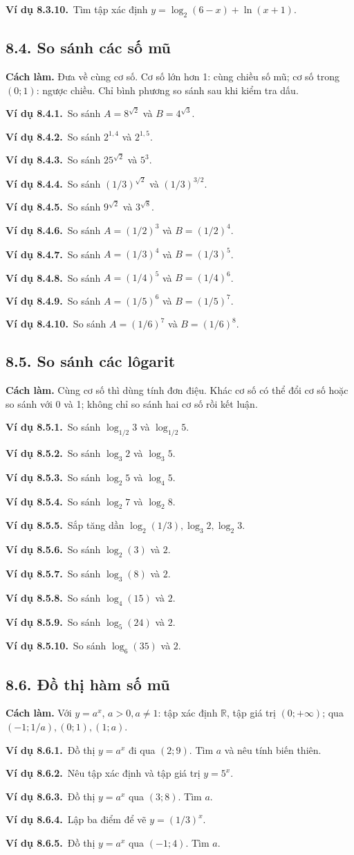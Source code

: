 \documentclass[11pt,a4paper]{article}
\newcommand{\vd}[1]{\par\Needspace{3\baselineskip}\textbf{\color{teal}Ví dụ #1.}\ }
\begin{document}
\vd{8.3.10}Tìm tập xác định $y=\log_2(6-x)+\ln(x+1)$.
\clearpage\subsection{8.4. So sánh các số mũ}
\begin{tcolorbox}\textbf{Cách làm.} Đưa về cùng cơ số. Cơ số lớn hơn 1: cùng chiều số mũ; cơ số trong $(0;1)$: ngược chiều. Chỉ bình phương so sánh sau khi kiểm tra dấu.\end{tcolorbox}
\vd{8.4.1}So sánh $A=8^{\sqrt2}$ và $B=4^{\sqrt3}$.
\vd{8.4.2}So sánh $2^{1{,}4}$ và $2^{1{,}5}$.
\vd{8.4.3}So sánh $25^{\sqrt2}$ và $5^3$.
\vd{8.4.4}So sánh $(1/3)^{\sqrt2}$ và $(1/3)^{3/2}$.
\vd{8.4.5}So sánh $9^{\sqrt2}$ và $3^{\sqrt8}$.
\vd{8.4.6}So sánh $A=(1/2)^{3}$ và $B=(1/2)^{4}$.
\vd{8.4.7}So sánh $A=(1/3)^{4}$ và $B=(1/3)^{5}$.
\vd{8.4.8}So sánh $A=(1/4)^{5}$ và $B=(1/4)^{6}$.
\vd{8.4.9}So sánh $A=(1/5)^{6}$ và $B=(1/5)^{7}$.
\vd{8.4.10}So sánh $A=(1/6)^{7}$ và $B=(1/6)^{8}$.
\clearpage\subsection{8.5. So sánh các lôgarit}
\begin{tcolorbox}\textbf{Cách làm.} Cùng cơ số thì dùng tính đơn điệu. Khác cơ số có thể đổi cơ số hoặc so sánh với 0 và 1; không chỉ so sánh hai cơ số rồi kết luận.\end{tcolorbox}
\vd{8.5.1}So sánh $\log_{1/2}3$ và $\log_{1/2}5$.
\vd{8.5.2}So sánh $\log_3 2$ và $\log_3 5$.
\vd{8.5.3}So sánh $\log_2 5$ và $\log_4 5$.
\vd{8.5.4}So sánh $\log_2 7$ và $\log_2 8$.
\vd{8.5.5}Sắp tăng dần $\log_2(1/3),\log_3 2,\log_2 3$.
\vd{8.5.6}So sánh $\log_{2}(3)$ và $2$.
\vd{8.5.7}So sánh $\log_{3}(8)$ và $2$.
\vd{8.5.8}So sánh $\log_{4}(15)$ và $2$.
\vd{8.5.9}So sánh $\log_{5}(24)$ và $2$.
\vd{8.5.10}So sánh $\log_{6}(35)$ và $2$.
\clearpage\subsection{8.6. Đồ thị hàm số mũ}
\begin{tcolorbox}\textbf{Cách làm.} Với $y=a^x$, $a>0,a\ne1$: tập xác định $\mathbb R$, tập giá trị $(0;+\infty)$; qua $(-1;1/a),(0;1),(1;a)$.\end{tcolorbox}
\vd{8.6.1}Đồ thị $y=a^x$ đi qua $(2;9)$. Tìm $a$ và nêu tính biến thiên.
\vd{8.6.2}Nêu tập xác định và tập giá trị $y=5^x$.
\vd{8.6.3}Đồ thị $y=a^x$ qua $(3;8)$. Tìm $a$.
\vd{8.6.4}Lập ba điểm để vẽ $y=(1/3)^x$.
\vd{8.6.5}Đồ thị $y=a^x$ qua $(-1;4)$. Tìm $a$.
\end{document}
